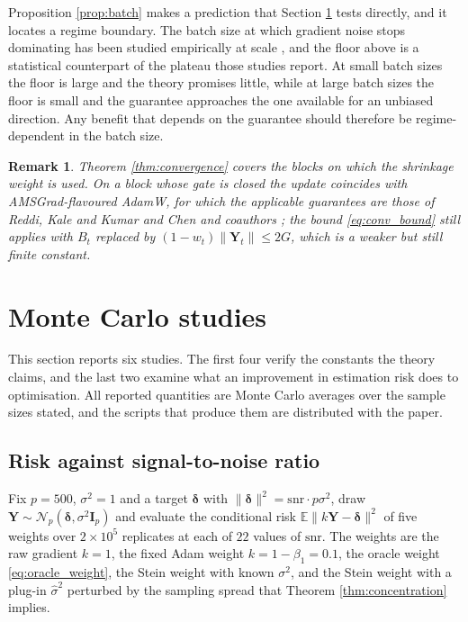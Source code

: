 \documentclass[pdflatex,sn-mathphys-num]{sn-jnl}%
\theoremstyle{thmstyleone}%
\theoremstyle{thmstyletwo}%
\newtheorem{remark}{Remark}%
\theoremstyle{thmstylethree}%
\newcommand{\E}{\mathbb{E}}
\begin{document}
Proposition \ref{prop:batch} makes a prediction that Section \ref{sec:simulation} tests directly, and it locates a regime boundary. The batch size at which gradient noise stops dominating has been studied empirically at scale \cite{keskar2017, smith2018, shallue2019}, and the floor above is a statistical counterpart of the plateau those studies report. At small batch sizes the floor is large and the theory promises little, while at large batch sizes the floor is small and the guarantee approaches the one available for an unbiased direction. Any benefit that depends on the guarantee should therefore be regime-dependent in the batch size.

\begin{remark}
Theorem \ref{thm:convergence} covers the blocks on which the shrinkage weight is used. On a block whose gate is closed the update coincides with AMSGrad-flavoured AdamW, for which the applicable guarantees are those of Reddi, Kale and Kumar \cite{reddi2018} and Chen and coauthors \cite{chen2019}; the bound \eqref{eq:conv_bound} still applies with $B_t$ replaced by $(1-w_t)\|\bm Y_t\|\le 2G$, which is a weaker but still finite constant.
\end{remark}

\section{Monte Carlo studies}
\label{sec:simulation}

This section reports six studies. The first four verify the constants the theory claims, and the last two examine what an improvement in estimation risk does to optimisation. All reported quantities are Monte Carlo averages over the sample sizes stated, and the scripts that produce them are distributed with the paper.

\subsection{Risk against signal-to-noise ratio}
\label{sec:sim_snr}

Fix $p=500$, $\sigma^2=1$ and a target $\bm\delta$ with $\|\bm\delta\|^2=\mathrm{snr}\cdot p\sigma^2$, draw $\bm Y\sim\mathcal N_p(\bm\delta,\sigma^2\bm I_p)$ and evaluate the conditional risk $\E\|k\bm Y-\bm\delta\|^2$ of five weights over $2\times10^{5}$ replicates at each of $22$ values of $\mathrm{snr}$. The weights are the raw gradient $k=1$, the fixed Adam weight $k=1-\beta_1=0.1$, the oracle weight \eqref{eq:oracle_weight}, the Stein weight with known $\sigma^2$, and the Stein weight with a plug-in $\hat\sigma^2$ perturbed by the sampling spread that Theorem \ref{thm:concentration} implies.
\end{document}
